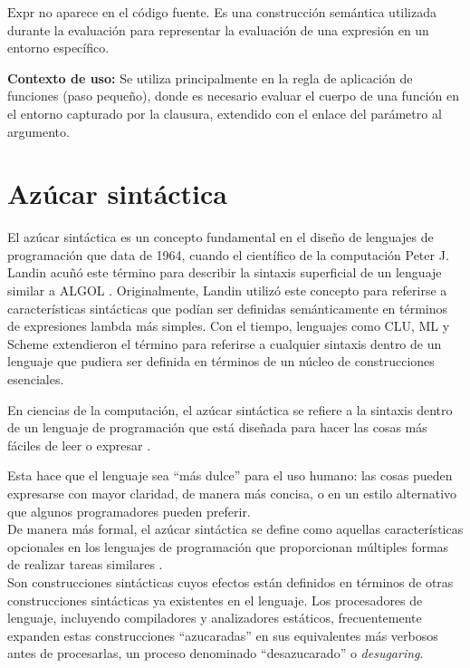 \documentclass[a4paper,12pt]{article}
\begin{document}
\begin{tcolorbox}[title=Correción:ASA de  LAMBDAE    MÓDULO A3, breakable]
\(\text{Expr}\) no aparece en el c\'odigo fuente. Es una construcci\'on sem\'antica utilizada durante la evaluaci\'on para representar la evaluaci\'on de una expresi\'on en un entorno espec\'ifico.

\medskip

\noindent\textbf{Contexto de uso:} Se utiliza principalmente en la regla de aplicaci\'on de funciones (paso pequeño), donde es necesario evaluar el cuerpo de una funci\'on en el entorno capturado por la clausura, extendido con el enlace del par\'ametro al argumento.

\end{tcolorbox}



\section{Azúcar sintáctica}

El azúcar sintáctica es un concepto fundamental en el diseño de lenguajes de programación que data de 1964, cuando el científico de la computación Peter J. Landin acuñó este término para describir la sintaxis superficial de un lenguaje similar a ALGOL \cite{WikiSintaxis,IBMFortran}. Originalmente, Landin utilizó este concepto para referirse a características sintácticas que podían ser definidas semánticamente en términos de expresiones lambda más simples. Con el tiempo, lenguajes como CLU, ML y Scheme extendieron el término para referirse a cualquier sintaxis dentro de un lenguaje que pudiera ser definida en términos de un núcleo de construcciones esenciales.

\begin{tcolorbox}[title= Definición: Azúcar Sintáctica]

En ciencias de la computación, el azúcar sintáctica se refiere a la sintaxis dentro de un lenguaje de programación que está diseñada para hacer las cosas más fáciles de leer o expresar \cite{Serokell2020,Rathi2020,WikiSintaxis}. 

Esta hace que el lenguaje sea ``más dulce'' para el uso humano: las cosas pueden expresarse con mayor claridad, de manera más concisa, o en un estilo alternativo que algunos programadores pueden preferir.\\
De manera más formal, el azúcar sintáctica se define como aquellas características opcionales en los lenguajes de programación que proporcionan múltiples formas de realizar tareas similares \cite{UNAMMaterial}. \\
Son construcciones sintácticas cuyos efectos están definidos en términos de otras construcciones sintácticas ya existentes en el lenguaje. Los procesadores de lenguaje, incluyendo compiladores y analizadores estáticos, frecuentemente expanden estas construcciones ``azucaradas'' en sus equivalentes más verbosos antes de procesarlas, un proceso denominado ``desazucarado'' o \textit{desugaring}.\\
\end{tcolorbox}
\end{document}
